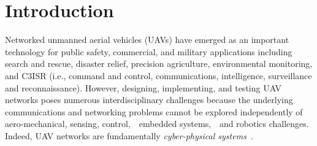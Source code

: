 \vspace{-3pt}
\section{Introduction}\label{sec:ch2:intro}

Networked unmanned aerial vehicles (UAVs) have emerged as an important technology for public safety, commercial, and military applications including search and rescue, disaster relief, precision agriculture, environmental monitoring, and C3ISR (i.e., command and control, communications, intelligence, surveillance and reconnaissance). 
However, designing, implementing, and testing UAV networks poses numerous interdisciplinary challenges because the underlying communications and networking problems cannot be explored independently of aero-mechanical, sensing, control,~~embedded systems,~~and robotics challenges. Indeed, UAV networks are fundamentally {\it cyber-physical systems}~\cite{namuduri2012airborne}.

